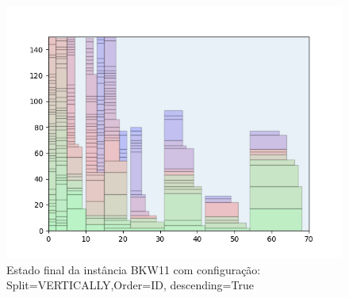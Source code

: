 \begin{figure}[H]
    \centering
    \caption[]{Estado final da instância BKW11 com configuração: Split=VERTICALLY,Order=ID, descending=True}
    \label{fig:bkw11-vertically-id-true}
    \includegraphics[scale=0.5]{output/figures/bkw/bkw11/vertically/id/true/000}
\end{figure}